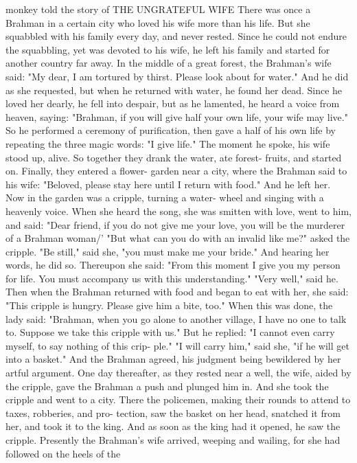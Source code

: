 \documentclass{book}
\begin{document}
monkey told the story of
THE UNGRATEFUL WIFE
There was once a Brahman in a certain city who
loved his wife more than his life. But she squabbled
with his family every day, and never rested. Since
he could not endure the squabbling, yet was devoted
to his wife, he left his family and started for another
country far away.
In the middle of a great forest, the Brahman's
wife said: "My dear, I am tortured by thirst. Please
look about for water." And he did as she requested,
but when he returned with water, he found her dead.
Since he loved her dearly, he fell into despair,
but as he lamented, he heard a voice from heaven,
saying: "Brahman, if you will give half your own
life, your wife may live." So he performed a ceremony
of purification, then gave a half of his own life by
repeating the three magic words: "I give life." The
moment he spoke, his wife stood up, alive.
So together they drank the water, ate forest-
fruits, and started on. Finally, they entered a flower-
garden near a city, where the Brahman said to his
wife: "Beloved, please stay here until I return with
food." And he left her.
Now in the garden was a cripple, turning a water-
wheel and singing with a heavenly voice. When she
heard the song, she was smitten with love, went to
him, and said: "Dear friend, if you do not give me
your love, you will be the murderer of a Brahman
woman/' "But what can you do with an invalid like
me?" asked the cripple. "Be still," said she, "you
must make me your bride." And hearing her words,
he did so. Thereupon she said: "From this moment
I give you my person for life. You must accompany
us with this understanding." "Very well," said he.
Then when the Brahman returned with food and
began to eat with her, she said: "This cripple is
hungry. Please give him a bite, too." When this was
done, the lady said: "Brahman, when you go alone
to another village, I have no one to talk to. Suppose
we take this cripple with us." But he replied: "I
cannot even carry myself, to say nothing of this crip-
ple." "I will carry him," said she, "if he will get into
a basket." And the Brahman agreed, his judgment
being bewildered by her artful argument.
One day thereafter, as they rested near a well,
the wife, aided by the cripple, gave the Brahman a
push and plunged him in. And she took the cripple
and went to a city. There the policemen, making
their rounds to attend to taxes, robberies, and pro-
tection, saw the basket on her head, snatched it from
her, and took it to the king. And as soon as the king
had it opened, he saw the cripple.
Presently the Brahman's wife arrived, weeping
and wailing, for she had followed on the heels of the
\end{document}
